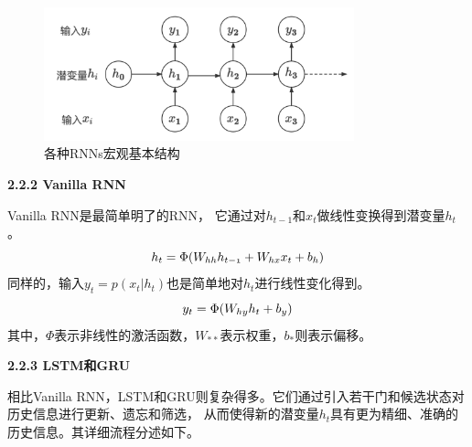       \begin{figure}[htbp]
        \centering
        \includegraphics[width=0.8\textwidth]{Figures/RNNs.png}
        \caption{各种RNNs宏观基本结构}
        \label{pic:RNNs}
      \end{figure}
      
      \textbf{2.2.2 Vanilla RNN}

      Vanilla RNN是最简单明了的RNN，
      它通过对$h_{t-1}$和$x_{t}$做线性变换得到潜变量$h_t$。
      \begin{equation} \label{va_rnn_hidden}
        \mathnormal{h_t} = \Phi(\mathnormal{W_{hh}}\mathnormal{h_{t-1}} + 
        \mathnormal{W_{hx}}\mathnormal{x_{t}} + \mathnormal{b_h})
      \end{equation}
      同样的，输入$y_t = p(x_t | h_t)$也是简单地对$h_t$进行线性变化得到。
      \begin{equation}
        \mathnormal{y_t} = \Phi(W_{hy}h_t + b_y)
      \end{equation}
    其中，$\Phi$表示非线性的激活函数，$W_{**}$表示权重，$b_*$则表示偏移。

      \textbf{2.2.3 LSTM和GRU}

      相比Vanilla RNN，LSTM和GRU则复杂得多。它们通过引入若干门和候选状态对历史信息进行更新、遗忘和筛选，
      从而使得新的潜变量$h_t$具有更为精细、准确的历史信息。其详细流程分述如下。

